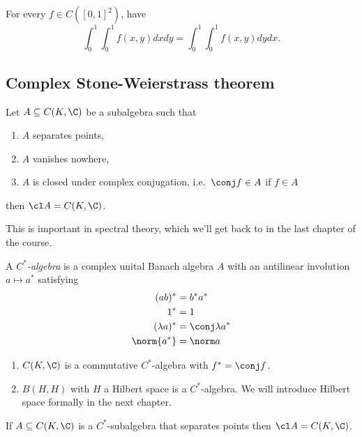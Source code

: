 \documentclass[a4paper]{article}
\begin{document}
\begin{corollary}
  For every \(f \in C([0, 1]^2)\), have
  \[
    \int_0^1 \int_0^1 f(x, y) dx dy = \int_0^1 \int_0^1 f(x, y) dy dx.
  \]
\end{corollary}

\subsection{Complex Stone-Weierstrass theorem}

\begin{theorem}
  Let \(A \subseteq C(K, \C)\) be a subalgebra such that
  \begin{enumerate}
  \item \(A\) separates points,
  \item \(A\) vanishes nowhere,
  \item \(A\) is closed under complex conjugation, i.e.\ \(\conj f \in A\) if \(f \in A\)
  \end{enumerate}
  then \(\cl A = C(K, \C)\).
\end{theorem}

This is important in spectral theory, which we'll get back to in the last chapter of the course.

\begin{definition}[\(C^*\)-algebra]
  A \emph{\(C^*\)-algebra} is a complex unital Banach algebra \(A\) with an antilinear involution \(a \mapsto a^*\) satisfying
  \begin{align*}
    (ab)^* & = b^*a^* \\
    1^* &= 1 \\
    (\lambda a)^* &= \conj \lambda a^* \\
    \norm{a^*} &= \norm a
  \end{align*}
\end{definition}

\begin{eg}\leavevmode
  \begin{enumerate}
  \item \(C(K, \C)\) is a commutative \(C^*\)-algebra with \(f^* = \conj f\).
  \item \(B(H, H)\) with \(H\) a Hilbert space is a \(C^*\)-algebra. We will introduce Hilbert space formally in the next chapter.
  \end{enumerate}
\end{eg}

\begin{corollary}
  If \(A \subseteq C(K, \C)\) is a \(C^*\)-subalgebra that separates points then \(\cl A = C(K, \C)\).
\end{corollary}
\end{document}
